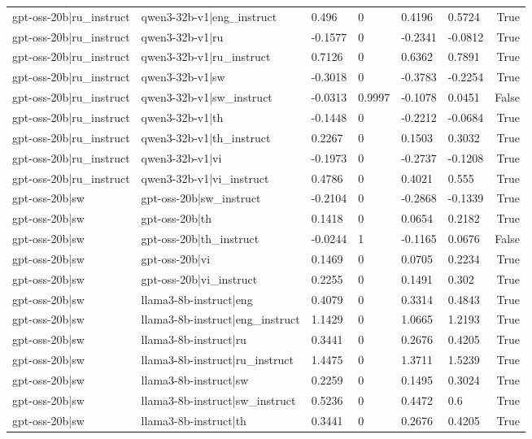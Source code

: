 \begin{table}
\begin{tabular}{llllllr}
gpt-oss-20b|ru_instruct & qwen3-32b-v1|eng_instruct & 0.496 & 0 & 0.4196 & 0.5724 & True \\
gpt-oss-20b|ru_instruct & qwen3-32b-v1|ru & -0.1577 & 0 & -0.2341 & -0.0812 & True \\
gpt-oss-20b|ru_instruct & qwen3-32b-v1|ru_instruct & 0.7126 & 0 & 0.6362 & 0.7891 & True \\
gpt-oss-20b|ru_instruct & qwen3-32b-v1|sw & -0.3018 & 0 & -0.3783 & -0.2254 & True \\
gpt-oss-20b|ru_instruct & qwen3-32b-v1|sw_instruct & -0.0313 & 0.9997 & -0.1078 & 0.0451 & False \\
gpt-oss-20b|ru_instruct & qwen3-32b-v1|th & -0.1448 & 0 & -0.2212 & -0.0684 & True \\
gpt-oss-20b|ru_instruct & qwen3-32b-v1|th_instruct & 0.2267 & 0 & 0.1503 & 0.3032 & True \\
gpt-oss-20b|ru_instruct & qwen3-32b-v1|vi & -0.1973 & 0 & -0.2737 & -0.1208 & True \\
gpt-oss-20b|ru_instruct & qwen3-32b-v1|vi_instruct & 0.4786 & 0 & 0.4021 & 0.555 & True \\
gpt-oss-20b|sw & gpt-oss-20b|sw_instruct & -0.2104 & 0 & -0.2868 & -0.1339 & True \\
gpt-oss-20b|sw & gpt-oss-20b|th & 0.1418 & 0 & 0.0654 & 0.2182 & True \\
gpt-oss-20b|sw & gpt-oss-20b|th_instruct & -0.0244 & 1 & -0.1165 & 0.0676 & False \\
gpt-oss-20b|sw & gpt-oss-20b|vi & 0.1469 & 0 & 0.0705 & 0.2234 & True \\
gpt-oss-20b|sw & gpt-oss-20b|vi_instruct & 0.2255 & 0 & 0.1491 & 0.302 & True \\
gpt-oss-20b|sw & llama3-8b-instruct|eng & 0.4079 & 0 & 0.3314 & 0.4843 & True \\
gpt-oss-20b|sw & llama3-8b-instruct|eng_instruct & 1.1429 & 0 & 1.0665 & 1.2193 & True \\
gpt-oss-20b|sw & llama3-8b-instruct|ru & 0.3441 & 0 & 0.2676 & 0.4205 & True \\
gpt-oss-20b|sw & llama3-8b-instruct|ru_instruct & 1.4475 & 0 & 1.3711 & 1.5239 & True \\
gpt-oss-20b|sw & llama3-8b-instruct|sw & 0.2259 & 0 & 0.1495 & 0.3024 & True \\
gpt-oss-20b|sw & llama3-8b-instruct|sw_instruct & 0.5236 & 0 & 0.4472 & 0.6 & True \\
gpt-oss-20b|sw & llama3-8b-instruct|th & 0.3441 & 0 & 0.2676 & 0.4205 & True \\

\end{tabular}
\end{table}
